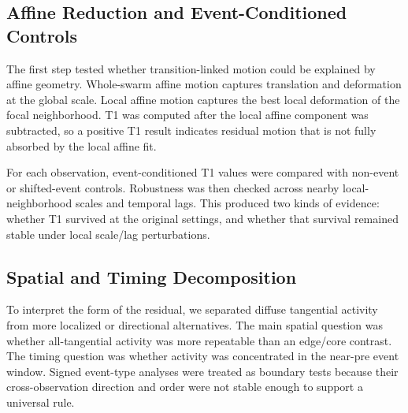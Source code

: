 \subsection{Affine Reduction and Event-Conditioned Controls}

The first step tested whether transition-linked motion could be explained by
affine geometry. Whole-swarm affine motion captures translation and deformation
at the global scale. Local affine motion captures the best local deformation of
the focal neighborhood. T1 was computed after the local affine component was
subtracted, so a positive T1 result indicates residual motion that is not fully
absorbed by the local affine fit.

For each observation, event-conditioned T1 values were compared with
non-event or shifted-event controls. Robustness was then checked across nearby
local-neighborhood scales and temporal lags. This produced two kinds of
evidence: whether T1 survived at the original settings, and whether that
survival remained stable under local scale/lag perturbations.

\subsection{Spatial and Timing Decomposition}

To interpret the form of the residual, we separated diffuse tangential
activity from more localized or directional alternatives. The main spatial
question was whether all-tangential activity was more repeatable than an
edge/core contrast. The timing question was whether activity was concentrated
in the near-pre event window. Signed event-type analyses were treated as
boundary tests because their cross-observation direction and order were not
stable enough to support a universal rule.

